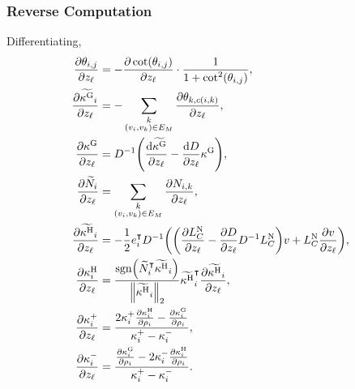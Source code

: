 \subsubsection{Reverse Computation}
Differentiating, \begin{align*}
	\frac{\partial\theta_{i, j}}{\partial z_\ell} &= -\frac{\partial\cot\pof{\theta_{i, j}}}{\partial z_\ell} \cdot \frac{1}{1 + \cot^2\pof{\theta_{i, j}}}, \\
	\frac{\partial\widetilde{\kappa^\text{G}}_i}{\partial z_\ell} &= -\sum_{\substack{k \\ \pof{v_i, v_k} \in E_M}} \frac{\partial\theta_{k, c\pof{i, k}}}{\partial z_\ell}, \\
	\frac{\partial\kappa^\text{G}}{\partial z_\ell} &= D^{-1}\pof{\frac{\dif\widetilde{\kappa^\text{G}}}{\partial z_\ell} - \frac{\dif D}{\partial z_\ell}\kappa^\text{G}}, \\
	\frac{\partial\widetilde{N}_i}{\partial z_\ell} &= \sum_{\substack{k \\ \pof{v_i, v_k} \in E_M}} \frac{\partial N_{i, k}}{\partial z_\ell}, \\
	\frac{\partial\widetilde{\kappa^\text{H}}_i}{\partial z_\ell} &= -\frac{1}{2}e_i^\intercal D^{-1}\pof{\pof{\frac{\partial L_C^{\text{N}}}{\partial z_\ell} - \frac{\partial D}{\partial z_\ell}D^{-1}L_C^{\text{N}}}v + L_C^{\text{N}}\frac{\partial v}{\partial z_\ell}}, \\
	\frac{\partial\kappa_i^\text{H}}{\partial z_\ell} &= \frac{\sgn\pof{\widetilde{N}_i^\intercal\widetilde{\kappa^\text{H}}_i}}{\norm{\widetilde{\kappa^\text{H}}_i}_2}\widetilde{\kappa^\text{H}}_i^\intercal\frac{\partial\widetilde{\kappa^\text{H}}_i}{\partial z_\ell}, \\
	\frac{\partial\kappa^+_i}{\partial z_\ell} &= \frac{2\kappa^+_i\frac{\partial\kappa^{\text{H}}_i}{\partial\rho_i} - \frac{\partial\kappa^{\text{G}}_i}{\partial\rho_i}}{\kappa^+_i - \kappa^-_i}, \\
	\frac{\partial\kappa^-_i}{\partial z_\ell} &= \frac{\frac{\partial\kappa^{\text{G}}_i}{\partial\rho_i} - 2\kappa^-_i\frac{\partial\kappa^{\text{H}}_i}{\partial\rho_i}}{\kappa^+_i - \kappa^-_i}.
\end{align*}

